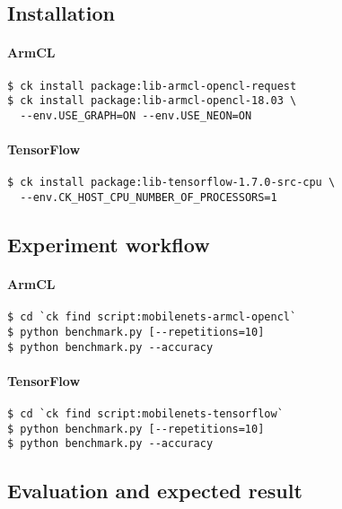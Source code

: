\subsection{Installation}

\paragraph{ArmCL}

\begin{verbatim}
$ ck install package:lib-armcl-opencl-request
$ ck install package:lib-armcl-opencl-18.03 \
  --env.USE_GRAPH=ON --env.USE_NEON=ON
\end{verbatim}

\paragraph{TensorFlow}

\begin{verbatim}
$ ck install package:lib-tensorflow-1.7.0-src-cpu \
  --env.CK_HOST_CPU_NUMBER_OF_PROCESSORS=1
\end{verbatim}


\subsection{Experiment workflow}

\paragraph{ArmCL}

\begin{verbatim}
$ cd `ck find script:mobilenets-armcl-opencl`
$ python benchmark.py [--repetitions=10]
$ python benchmark.py --accuracy
\end{verbatim}

\paragraph{TensorFlow}

\begin{verbatim}
$ cd `ck find script:mobilenets-tensorflow`
$ python benchmark.py [--repetitions=10]
$ python benchmark.py --accuracy
\end{verbatim}


\subsection{Evaluation and expected result}

